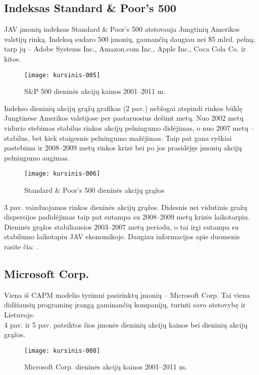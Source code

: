 \documentclass[12pt, a14paper, lithuanian]{article}
\begin{document}
\subsection{Indeksas Standard \& Poor's 500}

JAV įmonių indeksas Standard \& Poor's 500 atstovauja Jungtinių Amerikos valstijų
rinką. Indeksą sudaro 500 įmonių, gaunančių daugiau nei \$5 mlrd. pelną; tarp jų -- Adobe Systems Inc.,
Amazon.com Inc., Apple Inc., Coca Cola Co. ir kitos. \\


\begin{figure}[H]
  \centering
\texttt{[image: kursinis-005]}
  \caption{S\&P 500 dieninės akcijų kainos 2001--2011 m.}
  \label{fig:2}
\end{figure}

Indekso dieninių akcijų grąžų grafikas (2 pav.) neblogai atspindi rinkos būklę Jungtinėse Amerikos valstijose per pastaruosius dešimt metų. Nuo 2002 metų vidurio stebimas stabilus rinkos akcijų pelningumo didėjimas, o nuo 2007 metų -- stabilus, bet kiek staigesnis pelningumo mažėjimas.
Taip pat gana ryškiai pastebima ir 2008--2009 metų rinkos krizė bei po jos prasidėjęs įmonių akcijų pelningumo augimas.

\begin{figure}[H]
  \centering
\texttt{[image: kursinis-006]}
  \caption{Standard \& Poor's 500 dieninės akcijų grąžos}
  \label{fig:3}
\end{figure}

3 pav. vaizduojamos rinkos dieninės akcijų grąžos. Didesnis nei vidutinis gražų dispersijos padidėjimas
taip pat sutampa su 2008--2009 metų krizės laikotarpiu. Dieninės grąžos stabiliausios 2003--2007 metų periodu,
o tai irgi sutampa su stabilumo laikotapiu JAV ekonomikoje. Daugiau informacijos apie duomenis rasite čia: \cite{market}.    \\


\subsection{Microsoft Corp.}

Viena iš CAPM modelio tyrimui pasirinktų įmonių -- Microsoft Corp. Tai viena didžiausių programinę įrangą
 gaminančių kompanijų, turinti savo atstovybę ir Lietuvoje. \\
 
 4 pav. ir 5 pav. pateiktos šios įmonės dieninių akcijų kainos
 bei dieninių akcijų grąžos.
 
\begin{figure}[H]
  \centering
\texttt{[image: kursinis-008]}
  \caption{Microsoft Corp. dieninės akcijų kainos 2001--2011 m.}
  \label{fig:4}
\end{figure}
\end{document}
